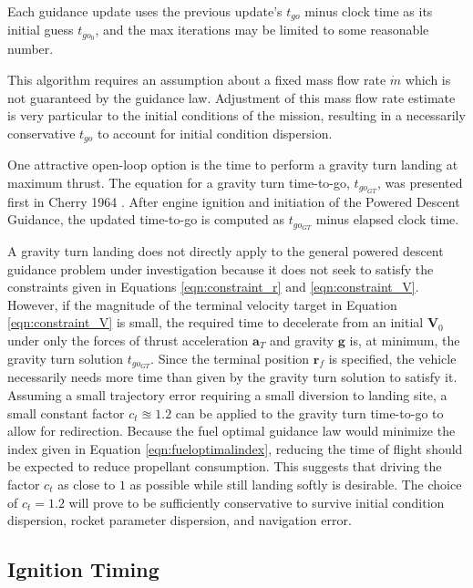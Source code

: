 Each guidance update uses the previous update's $t_{go}$ minus clock time as its initial guess $t_{go_0}$, and the max iterations may be limited to some reasonable number.

This algorithm requires an assumption about a fixed mass flow rate $\dot{m}$ which is not guaranteed by the guidance law. Adjustment of this mass flow rate estimate is very particular to the initial conditions of the mission, resulting in a necessarily conservative $t_{go}$ to account for initial condition dispersion.

One attractive open-loop option is the time to perform a gravity turn landing at maximum thrust. The equation for a gravity turn time-to-go, $t_{go_{GT}}$, was presented first in Cherry 1964 \cite{CHERRY}. After engine ignition and initiation of the Powered Descent Guidance, the updated time-to-go is computed as $t_{go_{GT}}$ minus elapsed clock time.

A gravity turn landing does not directly apply to the general powered descent guidance problem under investigation because it does not seek to satisfy the constraints given in Equations \ref{eqn:constraint_r} and \ref{eqn:constraint_V}. However, if the magnitude of the terminal velocity target in Equation \ref{eqn:constraint_V} is small, the required time to decelerate from an initial $\boldsymbol{V}_0$ under only the forces of thrust acceleration $\boldsymbol{a}_T$ and gravity $\boldsymbol{g}$ is, at minimum, the gravity turn solution $t_{go_{GT}}$. Since the terminal position $\boldsymbol{r}_f$ is specified, the vehicle necessarily needs more time than given by the gravity turn solution to satisfy it. Assuming a small trajectory error requiring a small diversion to landing site, a small constant factor $ c_t \approxeq 1.2$ can be applied to the gravity turn time-to-go to allow for redirection. Because the fuel optimal guidance law would minimize the index given in Equation \ref{eqn:fueloptimalindex}, reducing the time of flight should be expected to reduce propellant consumption. This suggests that driving the factor $c_t$ as close to $1$ as possible while still landing softly is desirable. The choice of $c_t = 1.2$ will prove to be sufficiently conservative to survive initial condition dispersion, rocket parameter dispersion, and navigation error. 

\subsection{Ignition Timing}


